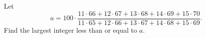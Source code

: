 Let
\[a=100\cdot\dfrac{11\cdot66+12\cdot67+13\cdot68+14\cdot69+15\cdot70}{11\cdot65+12\cdot66+13\cdot67+14\cdot68+15\cdot69}.\]
Find the largest integer less than or equal to $a$.
